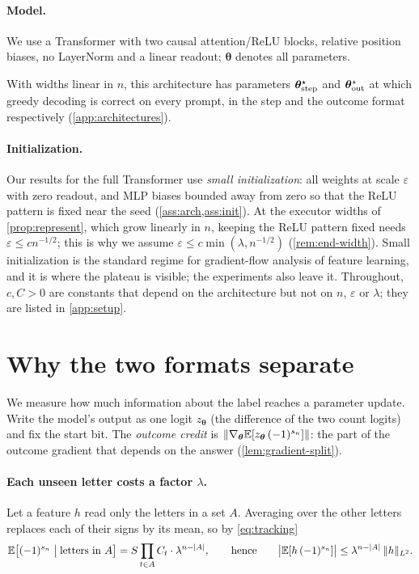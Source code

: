 \paragraph{Model.} We use a Transformer with two causal attention/ReLU blocks, relative position
biases, no LayerNorm and a linear readout; $\bm\theta$ denotes all parameters.

\begin{proposition}
\label{prop:represent}
With widths linear in $n$, this architecture has parameters $\bm\theta^\star_{\mathrm{step}}$ and $\bm\theta^\star_{\mathrm{out}}$ at which greedy decoding
is correct on every prompt, in the step and the outcome format respectively (\cref{app:architectures}).
\end{proposition}

\paragraph{Initialization.} Our results for the full Transformer use \emph{small initialization}: all weights at scale
$\varepsilon$ with zero readout, and MLP biases bounded away from zero so that the ReLU pattern is fixed
near the seed (\cref{ass:arch,ass:init}). At the executor widths of \cref{prop:represent}, which grow linearly in $n$, keeping
the ReLU pattern fixed needs $\varepsilon\le cn^{-1/2}$; this is why we assume $\varepsilon\le c\min(\lambda,n^{-1/2})$
(\cref{rem:end-width}). Small initialization is the standard regime for gradient-flow analysis of feature learning, and it
is where the plateau is visible; the experiments also leave it.
Throughout, $c,C>0$ are constants that depend on the architecture but not on $n$, $\varepsilon$ or $\lambda$;
they are listed in \cref{app:setup}.

\section{Why the two formats separate}
\label{sec:credit}
\label{sec:outcome}

We measure how much information about the label reaches a parameter update. Write the model's
output as one logit $z_{\bm\theta}$ (the difference of the two count logits) and fix the start bit.
The \emph{outcome credit} is $\|\nabla_{\bm\theta}\mathbb E[z_{\bm\theta}\,(-1)^{s_n}]\|$: the part of the outcome
gradient that depends on the answer (\cref{lem:gradient-split}).

\paragraph{Each unseen letter costs a factor $\lambda$.} Let a feature $h$ read only the letters in a set $A$. Averaging
over the other letters replaces each of their signs by its mean, so by \cref{eq:tracking}
\begin{equation}
 \mathbb E\bigl[(-1)^{s_n}\bigm| \text{letters in }A\bigr]=S\prod_{t\in A}C_t\cdot\lambda^{n-|A|},
 \qquad\text{hence}\qquad
 \bigl|\mathbb E[h\,(-1)^{s_n}]\bigr|\le\lambda^{n-|A|}\,\|h\|_{L^2}.
 \label{eq:credit-degree}
\end{equation}

